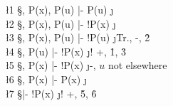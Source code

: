 \documentclass[class=cs245,leqno]{agony}
\begin{document}
\begin{xca}
\end{xca}
\begin{prf}
  \begin{deduce}
    \l1 \S, \X[x]P(x), P(u) |- P(u)       \j {\E}                      \\
    \l2 \S, \X[x]P(x), P(u) |- \A[x]!P(x) \j {\E}                      \\
    \l3 \S, \X[x]P(x), P(u) |- !P(u)      \j {Tr., \A -, \r2}          \\
    \l4 \S, P(u)            |- !\X[x]P(x) \j {! +, \r1, \r3}           \\
    \l5 \S, \X[x]P(x)       |- !\X[x]P(x) \j {\X -, $u$ not elsewhere} \\
    \l6 \S, \X[x]P(x)       |- \X[x]P(x)  \j {\E}                      \\
    \l7 \S                  |- !\X[x]P(x) \j {! +, \r5, \r6}
  \end{deduce}
\end{prf}
\end{document}
